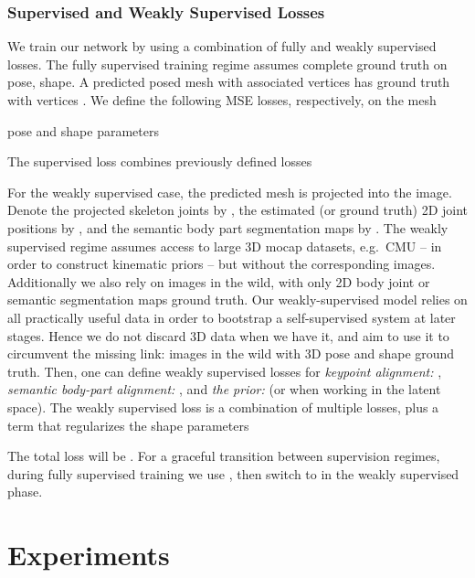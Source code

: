 \documentclass[runningheads]{llncs}
\newcommand{\eg}{e.g.\ }
\begin{document}
\subsubsection{Supervised and Weakly Supervised Losses}\label{sec:loses}
We train our network by using a combination of fully and weakly supervised losses. The fully supervised training regime assumes complete ground truth on pose, shape. A predicted posed mesh  with  associated vertices  
has ground truth  with vertices .
We define the following MSE losses, respectively, on the mesh 

pose and shape parameters

The supervised loss combines previously defined losses

For the weakly supervised case, the predicted mesh  is projected into the image. Denote the projected skeleton joints by ,
the estimated (or ground truth) 2D joint positions by , and the semantic body part segmentation maps by . The weakly supervised regime assumes access to large 3D mocap datasets, \eg CMU -- in order to construct kinematic priors -- but without the corresponding images. Additionally we also rely on images in the wild, with only 2D body joint or semantic segmentation maps ground truth. Our weakly-supervised model relies on all practically useful data in order to bootstrap a self-supervised system at later stages. Hence we do not discard 3D data when we have it, and aim to use it to circumvent the missing link: images in the wild with 3D pose and shape ground truth. 
Then, one can define weakly supervised losses for \emph{keypoint alignment:} , \emph{semantic body-part alignment:} , and \emph{the prior:}  (or  when working in the latent space). The weakly supervised loss is a combination of multiple losses, plus a term that regularizes the shape parameters

The total loss will be . For a graceful transition between supervision regimes, during fully supervised training we use , then switch to  in the weakly supervised phase.

\section{Experiments}
\label{sec:exps}
\end{document}
